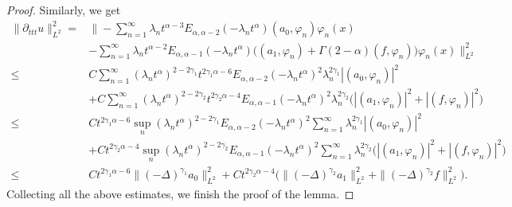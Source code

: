 \documentclass[11pt]{article}
\numberwithin{equation}{section}
\begin{document}
\begin{proof}
Similarly, we get
\begin{align*}
\|\partial_{ttt}u\|_{L^2}^2
=&\bigg\|-\sum_{n=1}^{\infty}\lambda_nt^{\alpha-3}E_{\alpha,\alpha-2}(-\lambda_nt^\alpha)(a_0,\varphi_n)\varphi_n(x)\\
&-\sum_{n=1}^{\infty} \lambda_nt^{\alpha-2}E_{\alpha,\alpha-1}(-\lambda_n t^\alpha)\Big((a_1, \varphi_n)+\Gamma(2-\alpha)(f, \varphi_n)\Big)  \varphi_n(x)\bigg\|_{L^2}^2\\
\le&C\sum_{n=1}^{\infty}(\lambda_nt^\alpha)^{2-2\gamma_1}t^{2\gamma_1\alpha-6}E_{\alpha,\alpha-2}(-\lambda_nt^\alpha)^2\lambda_n^{2\gamma_1}|(a_0,\varphi_n)|^2\\
&+C\sum_{n=1}^{\infty}(\lambda_nt^\alpha)^{2-2\gamma_2}t^{2\gamma_2\alpha-4}E_{\alpha,\alpha-1}(-\lambda_n t^\alpha)^2\lambda_n^{2\gamma_2}\Big(|(a_1, \varphi_n)|^2+|(f, \varphi_n)|^2\Big)\\
\le&Ct^{2\gamma_1\alpha-6}\sup_n(\lambda_nt^\alpha)^{2-2\gamma_1}E_{\alpha,\alpha-2}(-\lambda_n t^\alpha)^2\sum_{n=1}^{\infty}\lambda_n^{2\gamma_1}|(a_0,\varphi_n)|^2\\
&+Ct^{2\gamma_2\alpha-4}\sup_n(\lambda_nt^\alpha)^{2-2\gamma_2}E_{\alpha,\alpha-1}(-\lambda_n t^\alpha)^2\sum_{n=1}^{\infty}\lambda_n^{2\gamma_2}\Big(|(a_1, \varphi_n)|^2+|(f, \varphi_n)|^2\Big)\\
\le& Ct^{2\gamma_1\alpha-6}\|(-\Delta)^{\gamma_1}a_0\|_{L^2}^2 +Ct^{2\gamma_2\alpha-4}\Big(\|(-\Delta)^{\gamma_2}a_1\|_{L^2}^2+\|(-\Delta)^{\gamma_2}f\|_{L^2}^2\Big).
\end{align*}
Collecting all the above estimates, we finish the proof of the lemma.
\end{proof}
\end{document}
